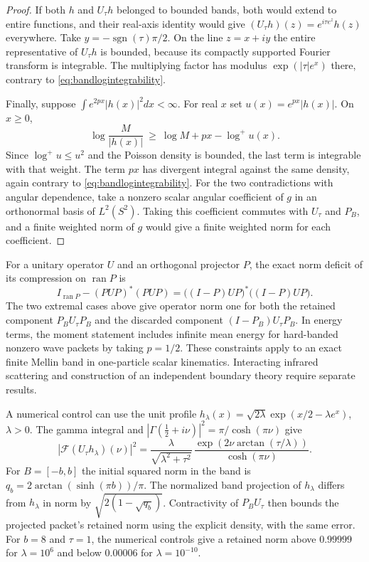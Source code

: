 \begin{proof}
If both $h$ and $U_\tau h$ belonged to bounded bands, both would
extend to entire functions, and their real-axis identity
would give $(U_\tau h)(z)=e^{i\tau e^z}h(z)$ everywhere.
Take $y=-\operatorname{sgn}(\tau)\pi/2$. On the line
$z=x+iy$ the entire representative of $U_\tau h$ is
bounded, because its compactly supported Fourier transform
is integrable. The multiplying factor has modulus
$\exp(|\tau|e^x)$ there, contrary to
\eqref{eq:bandlogintegrability}.

Finally, suppose $\int e^{2px}|h(x)|^2dx<\infty$. For real
$x$ set $u(x)=e^{px}|h(x)|$. On $x\ge0$,
\[
 \log\frac M{|h(x)|}\ \ge\ \log M+px-\log^+u(x).
\]
Since $\log^+u\le u^2$ and the Poisson density is bounded,
the last term is integrable with that weight. The term $px$
has divergent integral against the same density, again
contrary to \eqref{eq:bandlogintegrability}. For the two
contradictions with angular dependence, take a nonzero scalar
angular coefficient of $g$ in an orthonormal basis of $L^2(S^2)$.
Taking this coefficient commutes with $U_\tau$ and $P_B$, and
a finite weighted norm of $g$ would give a finite weighted
norm for each coefficient.
\end{proof}

For a unitary operator $U$ and an orthogonal projector $P$,
the exact norm deficit of its compression on $\operatorname{ran}P$ is
\[
 I_{\operatorname{ran}P}-(PUP)^*(PUP)
 =\big((I-P)UP\big)^*\big((I-P)UP\big).
\]
The two extremal cases above give operator norm one for both
the retained component $P_BU_\tau P_B$ and the discarded
component $(I-P_B)U_\tau P_B$. In energy terms, the moment
statement includes infinite mean energy for hard-banded
nonzero wave packets by taking $p=1/2$. These constraints
apply to an exact finite Mellin band in one-particle scalar
kinematics. Interacting infrared scattering and construction
of an independent boundary theory require separate results.

A numerical control can use the unit profile
$h_\lambda(x)=\sqrt{2\lambda}\exp(x/2-\lambda e^x)$, $\lambda>0$.
The gamma integral and $|\Gamma(\tfrac12+i\nu)|^2=\pi/\cosh(\pi\nu)$ give
\[
 |\mathcal F(U_\tau h_\lambda)(\nu)|^2
 = \frac{\lambda}{\sqrt{\lambda^2+\tau^2}}\,
   \frac{\exp(2\nu\arctan(\tau/\lambda))}{\cosh(\pi\nu)} .
\]
For $B=[-b,b]$ the initial squared norm in the band is
$q_b=2\arctan(\sinh(\pi b))/\pi$. The normalized band projection
of $h_\lambda$ differs from $h_\lambda$ in norm by
$\sqrt{2(1-\sqrt{q_b})}$. Contractivity of $P_BU_\tau$ then
bounds the projected packet's retained norm using the explicit
density, with the same error. For $b=8$ and $\tau=1$, the
numerical controls give a retained norm above $0.99999$ for
$\lambda=10^6$ and below $0.00006$ for $\lambda=10^{-10}$.
